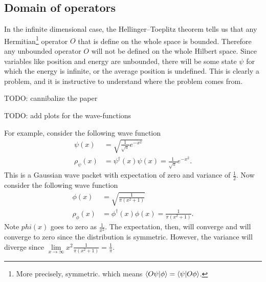 \subsection{Domain of operators}

In the infinite dimensional case, the Hellinger–Toeplitz theorem tells us that any Hermitian\footnote{More precisely, symmetric. which means $\langle O \psi | \phi \rangle = \langle\psi | O \phi\rangle$.} operator $O$ that is define on the whole space is bounded. Therefore any unbounded operator $O$ will not be defined on the whole Hilbert space. Since variables like position and energy are unbounded, there will be some state $\psi$ for which the energy is infinite, or the average position is undefined. This is clearly a problem, and it is instructive to understand where the problem comes from.

TODO: cannibalize the paper

TODO: add plots for the wave-functions

For example, consider the following wave function
\begin{align}
	\psi(x) &= \sqrt{\frac{1}{\sqrt{\pi}}e^{-x^2}} \\
	\rho_{\psi}(x) &= \psi^\dagger(x) \psi(x) = \frac{1}{\sqrt{\pi}} e^{-x^2}.
\end{align}
This is a Gaussian wave packet with expectation of zero and variance of $\frac{1}{2}$. Now consider the following wave function
\begin{align}
	\phi(x) &= \sqrt{\frac{1}{\pi(x^2 + 1)}} \\
	\rho_{\phi}(x) &= \phi^\dagger(x) \phi(x) = \frac{1}{\pi(x^2 + 1)}.
\end{align}
Note $phi(x)$ goes to zero as $\frac{1}{x^2}$. The expectation, then, will converge and will converge to zero since the distribution is symmetric. However, the variance will diverge since $\lim\limits_{x\to \infty} x^2 \frac{1}{\pi(x^2 + 1)} = \frac{1}{\pi}$.


